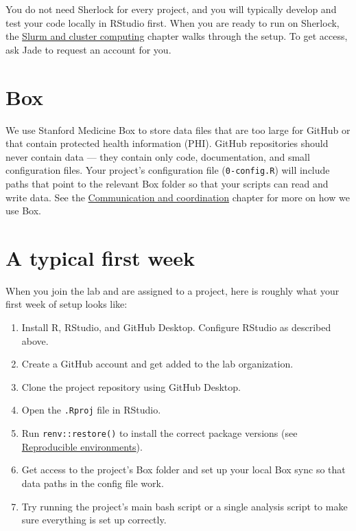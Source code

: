 \documentclass[
]{book}
\providecommand{\tightlist}{%
  \setlength{\itemsep}{0pt}\setlength{\parskip}{0pt}}
\begin{document}
You do not need Sherlock for every project, and you will typically develop and test your code locally in RStudio first. When you are ready to run on Sherlock, the \href{slurm.html}{Slurm and cluster computing} chapter walks through the setup. To get access, ask Jade to request an account for you.

\section{Box}\label{box}

We use Stanford Medicine Box to store data files that are too large for GitHub or that contain protected health information (PHI). GitHub repositories should never contain data --- they contain only code, documentation, and small configuration files. Your project's configuration file (\texttt{0-config.R}) will include paths that point to the relevant Box folder so that your scripts can read and write data. See the \href{communication-and-coordination.html}{Communication and coordination} chapter for more on how we use Box.

\section{A typical first week}\label{a-typical-first-week}

When you join the lab and are assigned to a project, here is roughly what your first week of setup looks like:

\begin{enumerate}
\def\labelenumi{\arabic{enumi}.}
\tightlist
\item
  Install R, RStudio, and GitHub Desktop. Configure RStudio as described above.
\item
  Create a GitHub account and get added to the lab organization.
\item
  Clone the project repository using GitHub Desktop.
\item
  Open the \texttt{.Rproj} file in RStudio.
\item
  Run \texttt{renv::restore()} to install the correct package versions (see \href{reproducible-environments.html}{Reproducible environments}).
\item
  Get access to the project's Box folder and set up your local Box sync so that data paths in the config file work.
\item
  Try running the project's main bash script or a single analysis script to make sure everything is set up correctly.
\end{enumerate}
\end{document}

